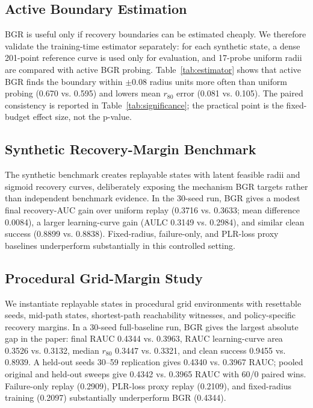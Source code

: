 \documentclass[letterpaper]{article}
\begin{document}
\begin{table}[t]
\centering
\small

\caption{Probe-efficiency validation on synthetic recovery curves. Both methods use 17 Bernoulli probes per state and are evaluated against dense 201-point curves. Active BGR improves boundary-hit rate over uniform probing at the same rollout budget, while keeping critical-radius and RAUC error comparable.}
\label{tab:estimator}
\end{table}

\FloatBarrier

\subsection{Active Boundary Estimation}

BGR is useful only if recovery boundaries can be estimated cheaply. We therefore validate the training-time estimator separately: for each synthetic state, a dense 201-point reference curve is used only for evaluation, and 17-probe uniform radii are compared with active BGR probing. Table~\ref{tab:estimator} shows that active BGR finds the boundary within $\pm0.08$ radius units more often than uniform probing (0.670 vs. 0.595) and lowers mean $r_{80}$ error (0.081 vs. 0.105). The paired consistency is reported in Table~\ref{tab:significance}; the practical point is the fixed-budget effect size, not the p-value.

\subsection{Synthetic Recovery-Margin Benchmark}

The synthetic benchmark creates replayable states with latent feasible radii and sigmoid recovery curves, deliberately exposing the mechanism BGR targets rather than independent benchmark evidence. In the 30-seed run, BGR gives a modest final recovery-AUC gain over uniform replay (0.3716 vs. 0.3633; mean difference 0.0084), a larger learning-curve gain (AULC 0.3149 vs. 0.2984), and similar clean success (0.8899 vs. 0.8838). Fixed-radius, failure-only, and PLR-loss proxy baselines underperform substantially in this controlled setting.

\subsection{Procedural Grid-Margin Study}

We instantiate replayable states in procedural grid environments with resettable seeds, mid-path states, shortest-path reachability witnesses, and policy-specific recovery margins. In a 30-seed full-baseline run, BGR gives the largest absolute gap in the paper: final RAUC 0.4344 vs. 0.3963, RAUC learning-curve area 0.3526 vs. 0.3132, median $r_{80}$ 0.3447 vs. 0.3321, and clean success 0.9455 vs. 0.8939. A held-out seeds 30--59 replication gives 0.4340 vs. 0.3967 RAUC; pooled original and held-out sweeps give 0.4342 vs. 0.3965 RAUC with 60/0 paired wins. Failure-only replay (0.2909), PLR-loss proxy replay (0.2109), and fixed-radius training (0.2097) substantially underperform BGR (0.4344).
\end{document}
